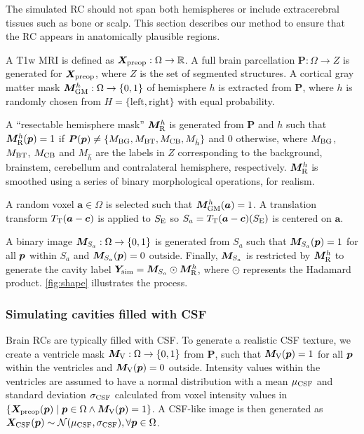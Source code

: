 The simulated \ac{RC} should not span both hemispheres or include extracerebral tissues such as bone or scalp.
This section describes our method to ensure that the \ac{RC} appears in anatomically plausible regions.

A \ac{T1w} \ac{MRI} is defined as $\bm{X}_{\textnormal{preop}} : \Omega \to \mathbb{R}$.
A full brain parcellation $\bm{P} : \Omega \to Z$ is generated \cite{cardoso_geodesic_2015} for $\bm{X}_{\textnormal{preop}}$,
where $Z$ is the set of segmented structures.
A cortical gray matter mask $\bm{M}_{\textnormal{GM}}^h : \Omega \to \{0, 1\}$
of hemisphere $h$ is extracted from $\bm{P}$,
where $h$ is randomly chosen from $H = \{\text{left}, \text{right}\}$ with equal probability.

A ``resectable hemisphere mask'' $\bm{M}_{\textnormal{R}}^h$ is generated from $\bm{P}$ and $h$ such that $\bm{M}_{\textnormal{R}}^h (\bm{p}) = 1$ if
${\bm{P}(\bm{p}) \neq \{M_{\textnormal{BG}}, M_{\textnormal{BT}}, M_{\textnormal{CB}}, M_{\hat{h}} \} }$
and $0$ otherwise,
where $M_{\textnormal{BG}}$, $M_{\textnormal{BT}}$, $M_{\textnormal{CB}}$ and $M_{\hat{h}}$ are the labels in $Z$ corresponding to the background, brainstem, cerebellum and contralateral hemisphere, respectively.
$\bm{M}_{\textnormal{R}}^h$ is smoothed using a series of binary morphological operations, for realism.


A random voxel $\bm{a} \in \Omega$ is selected such that $\bm{M}_{\textnormal{GM}}^h(\bm{a}) = 1$.
A translation transform $T_{\textnormal{T}}(\bm{a} - \bm{c})$ is applied to $S_{\textnormal{E}}$ so $S_a = T_{\textnormal{T}}(\bm{a} - \bm{c}) (S_{\textnormal{E}})$ is centered on $\bm{a}$.

A binary image $\bm{M}_{S_a} : \Omega \to  \{ 0, 1 \}$ is generated from $S_a$ such that $\bm{M}_{S_a}(\bm{p}) = 1$ for all $\bm{p}$ within $S_a$ and $\bm{M}_{S_a}(\bm{p}) = 0$ outside.
Finally, $\bm{M}_{S_a}$ is restricted by $\bm{M}_{\textnormal{R}}^h$ to generate the cavity label $\bm{Y}_{\textnormal{sim}} = \bm{M}_{S_a} \odot \bm{M}_{\textnormal{R}}^h$, where $\odot$ represents the Hadamard product.
\cref{fig:shape} illustrates the process.



\subsubsection{Simulating cavities filled with CSF}
\label{sec:texture_cavity}

Brain \acp{RC} are typically filled with \ac{CSF}.
To generate a realistic \acs{CSF} texture,
we create a ventricle mask
${\bm{M}_{\textnormal{V}} : \Omega \to \{ 0, 1 \}}$ from $\bm{P}$, such that
$\bm{M}_{\textnormal{V}}(\bm{p}) = 1$ for all $\bm{p}$ within the ventricles and
$\bm{M}_{\textnormal{V}}(\bm{p}) = 0$ outside.
Intensity values within the ventricles are assumed to have
a normal distribution \cite{gudbjartsson_rician_1995}
with a mean $\mu_{\textnormal{CSF}}$ and standard deviation $\sigma_{\textnormal{CSF}}$
calculated from voxel intensity values in
$\{ \bm{X}_{\textnormal{preop}}(\bm{p}) \mid \bm{p} \in \Omega \land \bm{M}_{\textnormal{V}}(\bm{p}) = 1 \}$.
A \acs{CSF}-like image is then generated as $\bm{X}_{\textnormal{CSF}}(\bm{p}) \sim \mathcal{N} (\mu_{\textnormal{CSF}}, \sigma_{\textnormal{CSF}}), \forall \bm{p} \in \Omega$.


